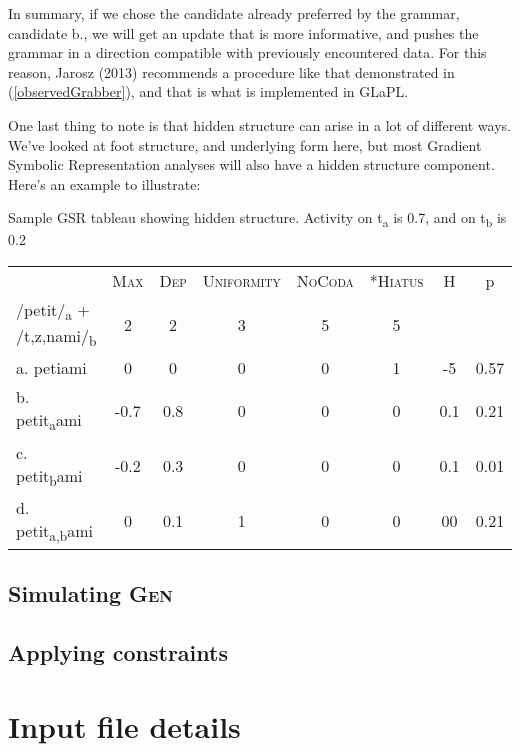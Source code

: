 \documentclass[12]{article}
\begin{document}
In summary, if we chose the candidate already preferred by the grammar, candidate b., we will get an update that is more informative, and pushes the grammar in a direction compatible with previously encountered data.  For this reason, Jarosz (2013) recommends a procedure like that demonstrated in (\ref{observedGrabber}), and that is what is implemented in GLaPL.

One last thing to note is that hidden structure can arise in a lot of different ways.  We've looked at foot structure, and underlying form here, but most Gradient Symbolic Representation analyses will also have a hidden structure component.  Here's an example to illustrate:


\begin{exe}
	\ex\label{GSRhidden} Sample GSR tableau showing hidden structure.  Activity on t\textsubscript{a} is 0.7, and on t\textsubscript{b} is 0.2
	
	\begin{tabular}{l|ccccc|cc}
				& \textsc{Max} & \textsc{Dep} & \textsc{Uniformity} & \textsc{NoCoda} & \textsc{*Hiatus} & H & p \\
	/petit/\textsubscript{a} + /{t,z,n}ami/\textsubscript{b} & 2 & 2 & 3 & 5 & 5 & & \\
	a. petiami &0&0&0&0& 1 & -5 & 0.57 \\
	b. petit\textsubscript{a}ami & -0.7 & 0.8 &0&0&0& 0.1 &0.21 \\
	c. petit\textsubscript{b}ami & -0.2 & 0.3 &0&0&0& 0.1 &0.01 \\
	d. petit\textsubscript{a,b}ami &0& 0.1 & 1&0&0& 00 & 0.21 \\
	
	\end{tabular}
	
\end{exe}


	  
	\subsection{Simulating \textsc{Gen}}
	\subsection{Applying constraints}

\section{Input file details}
\end{document}

